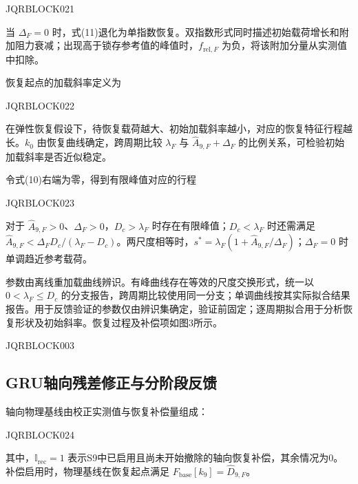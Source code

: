 JQRBLOCK021


当 $\Delta_F=0$ 时，式(11)退化为单指数恢复。双指数形式同时描述初始载荷增长和附加阻力衰减；出现高于锁存参考值的峰值时，$f_{\mathrm{rel},F}$ 为负，将该附加分量从实测值中扣除。





恢复起点的加载斜率定义为


JQRBLOCK022


在弹性恢复假设下，待恢复载荷越大、初始加载斜率越小，对应的恢复特征行程越长。$k_0$ 由恢复曲线确定，跨周期比较 $\lambda_F$ 与 $\widehat A_{9,F}+\Delta_F$ 的比例关系，可检验初始加载斜率是否近似稳定。





令式(10)右端为零，得到有限峰值对应的行程


JQRBLOCK023


对于 $\widehat A_{9,F}>0$、$\Delta_F>0$，$D_c>\lambda_F$ 时存在有限峰值；$D_c<\lambda_F$ 时还需满足 $\widehat A_{9,F}<\Delta_FD_c/(\lambda_F-D_c)$。两尺度相等时，$s^*=\lambda_F(1+\widehat A_{9,F}/\Delta_F)$；$\Delta_F=0$ 时单调趋近参考载荷。





参数由离线重加载曲线辨识。有峰曲线存在等效的尺度交换形式，统一以 $0<\lambda_F\le D_c$ 的分支报告，跨周期比较使用同一分支；单调曲线按其实际拟合结果报告。用于反馈验证的参数仅由辨识集确定，验证前固定；逐周期拟合用于分析恢复形状及初始斜率。恢复过程及补偿项如图3所示。







JQRBLOCK003







\subsection{GRU轴向残差修正与分阶段反馈}





轴向物理基线由校正实测值与恢复补偿量组成：


JQRBLOCK024


其中，$\mathbb I_{\mathrm{rec}}=1$ 表示S9中已启用且尚未开始撤除的轴向恢复补偿，其余情况为0。补偿启用时，物理基线在恢复起点满足 $F_{\mathrm{base}}[k_9]=\widehat D_{9,F}$。





